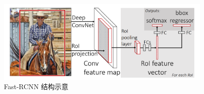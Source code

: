 \begin{figure}[!t]
	\centering
	\includegraphics[width=0.95\textwidth]{./imgs/fast-rcnn.png}
	\caption{Fast-RCNN 结构示意}
	\label{fig:fast-rcnn}
\end{figure}
